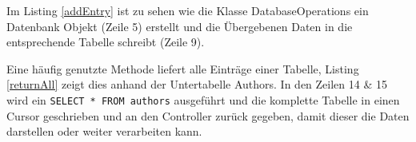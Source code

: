 

Im Listing \ref{addEntry} ist zu sehen wie die Klasse DatabaseOperations ein Datenbank Objekt (Zeile 5) erstellt und die Übergebenen Daten in die entsprechende Tabelle schreibt (Zeile 9).

 
 
 Eine häufig genutzte Methode liefert alle Einträge einer Tabelle, Listing \ref{returnAll} zeigt dies anhand der Untertabelle Authors. In den Zeilen 14 \& 15 wird ein \texttt{SELECT * FROM authors} ausgeführt und die komplette Tabelle in einen Cursor geschrieben und an den Controller zurück gegeben, damit dieser die Daten darstellen oder weiter verarbeiten kann.

